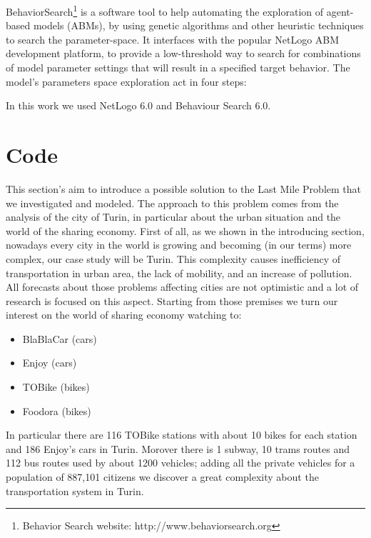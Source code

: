 \documentclass[11pt,a4paper]{article}
\begin{document}
BehaviorSearch\footnote{Behavior Search website: http://www.behaviorsearch.org} is a software tool to help automating the exploration of agent-based models (ABMs), by using genetic algorithms and other heuristic techniques to search the parameter-space. 
It interfaces with the popular NetLogo ABM development platform, to provide a low-threshold way to search for combinations of model parameter settings that will result in a specified target behavior. 
The model's parameters space exploration act in four steps:
\begin{center}
 \end{center}
\bigskip
In this work we used NetLogo 6.0 and Behaviour Search 6.0.

\newpage 
\section{Code}
This section's aim to introduce a possible solution to the Last Mile Problem that we investigated and modeled. 
The approach to this problem comes from the analysis of the city of Turin, in particular about the urban situation and the world of the sharing economy. 
First of all, as we shown in the introducing section, nowadays every city in the world is growing and becoming (in our terms) more complex, our case study will be Turin. 
This complexity causes inefficiency of transportation in urban area, the lack of mobility, and an increase of pollution. 
All forecasts about those problems  affecting cities are not optimistic and a lot of research is focused on this aspect. 
Starting from those premises we turn our interest on the world of sharing economy watching to:
\begin{center}
\begin{itemize}
\item BlaBlaCar (cars)
\item Enjoy (cars)
\item TOBike (bikes)
\item Foodora (bikes)
\end{itemize}
\end{center}
In particular there are 116 TOBike stations with about 10 bikes for each station and 186 Enjoy's cars in Turin. 
Morover there is 1 subway, 10 trams routes and 112 bus routes used by about 1200 vehicles; adding all the private vehicles for a population of 887,101 citizens we discover a great complexity about the transportation system in Turin. 
\end{document}
